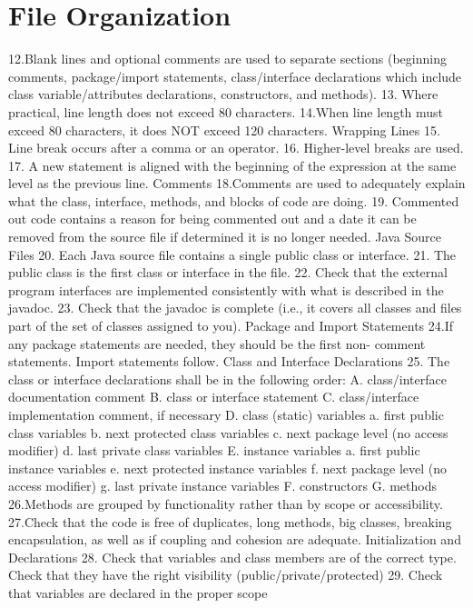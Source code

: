 \section{File Organization}
12.Blank lines and optional comments are used to separate sections (beginning comments, package/import statements, class/interface declarations which include class variable/attributes declarations, constructors, and methods).
13. Where practical, line length does not exceed 80 characters.
14.When line length must exceed 80 characters, it does NOT exceed 120 characters.
Wrapping Lines
15. Line break occurs after a comma or an operator.
16. Higher-level breaks are used.
17. A new statement is aligned with the beginning of the expression at the
same level as the previous line.
Comments
18.Comments are used to adequately explain what the class, interface, methods, and blocks of code are doing.
19. Commented out code contains a reason for being commented out and a date it can be removed from the source file if determined it is no longer needed.
Java Source Files
20. Each Java source file contains a single public class or interface.
21. The public class is the first class or interface in the file.
22. Check that the external program interfaces are implemented consistently
with what is described in the javadoc.
23. Check that the javadoc is complete (i.e., it covers all classes and files part
of the set of classes assigned to you).
Package and Import Statements
24.If any package statements are needed, they should be the first non- comment statements. Import statements follow.
Class and Interface Declarations
25. The class or interface declarations shall be in the following order:
A. class/interface documentation comment
B. class or interface statement
C. class/interface implementation comment, if necessary
D. class (static) variables
a. first public class variables
b. next protected class variables
c. next package level (no access modifier)
d. last private class variables
E. instance variables
a. first public instance variables
e. next protected instance variables
f. next package level (no access modifier)
g. last private instance variables
F. constructors
G. methods
26.Methods are grouped by functionality rather than by scope or
accessibility.
27.Check that the code is free of duplicates, long methods, big classes,
breaking encapsulation, as well as if coupling and cohesion are adequate.
Initialization and Declarations
28. Check that variables and class members are of the correct type. Check that they have the right visibility (public/private/protected)
29. Check that variables are declared in the proper scope
